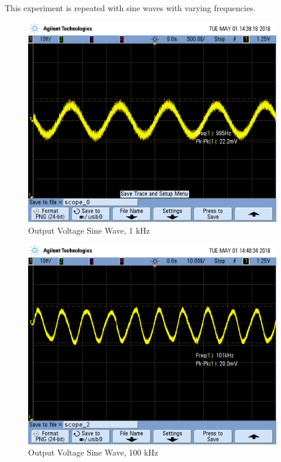 \FloatBarrier

This experiment is repeated with sine waves with varying frequencies.

\FloatBarrier

\begin{figure}[h!]
	\centering
	\includegraphics[scale=0.3]{../images/SCOPE_0.PNG}
	\caption{Output Voltage Sine Wave, 1 \si{\kilo\hertz}}
	\label{fig:1khz_original}
\end{figure}

\FloatBarrier

\begin{figure}[h!]
	\centering
	\includegraphics[scale=0.3]{../images/SCOPE_2.PNG}
	\caption{Output Voltage Sine Wave, 100 \si{\kilo\hertz}}
	\label{fig:100khz_original}
\end{figure}

